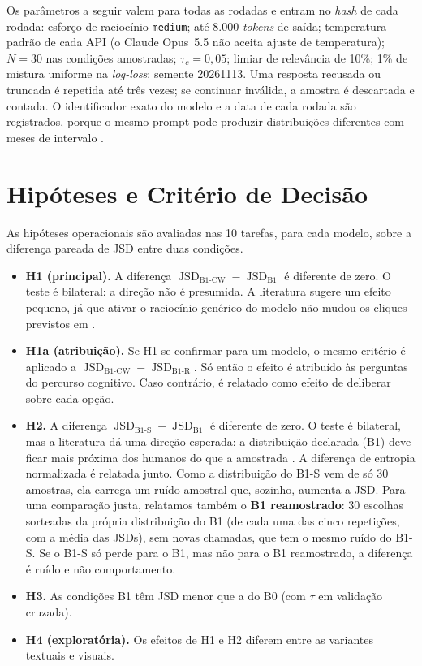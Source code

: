 \documentclass[12pt,oneside,a4paper,chapter=TITLE,english,brazil]{abntex2}
\newcommand{\code}[1]{\texttt{#1}}
\DeclareMathOperator{\JSD}{JSD}
\begin{document}
Os parâmetros a seguir valem para todas as rodadas e entram no \textit{hash} de cada rodada: esforço de raciocínio \code{medium}; até 8.000 \textit{tokens} de saída; temperatura padrão de cada API (o Claude Opus~5.5 não aceita ajuste de temperatura); $N=30$ nas condições amostradas; $\tau_c=0{,}05$; limiar de relevância de 10\%; 1\% de mistura uniforme na \textit{log-loss}; semente 20261113. Uma resposta recusada ou truncada é repetida até três vezes; se continuar inválida, a amostra é descartada e contada. O identificador exato do modelo e a data de cada rodada são registrados, porque o mesmo prompt pode produzir distribuições diferentes com meses de intervalo \cite{bisbee2024synthetic}.

\section{Hipóteses e Critério de Decisão}
\label{sec:hipoteses}

As hipóteses operacionais são avaliadas nas 10 tarefas, para cada modelo, sobre a diferença pareada de JSD entre duas condições.

\begin{itemize}
\item \textbf{H1 (principal).} A diferença $\JSD_{\text{B1-CW}}-\JSD_{\text{B1}}$ é diferente de zero. O teste é bilateral: a direção não é presumida. A literatura sugere um efeito pequeno, já que ativar o raciocínio genérico do modelo não mudou os cliques previstos em .
\item \textbf{H1a (atribuição).} Se H1 se confirmar para um modelo, o mesmo critério é aplicado a $\JSD_{\text{B1-CW}}-\JSD_{\text{B1-R}}$. Só então o efeito é atribuído às perguntas do percurso cognitivo. Caso contrário, é relatado como efeito de deliberar sobre cada opção.
\item \textbf{H2.} A diferença $\JSD_{\text{B1-S}}-\JSD_{\text{B1}}$ é diferente de zero. O teste é bilateral, mas a literatura dá uma direção esperada: a distribuição declarada (B1) deve ficar mais próxima dos humanos do que a amostrada \cite{meister2025distributional,jang2026cannotsample}. A diferença de entropia normalizada é relatada junto. Como a distribuição do B1-S vem de só 30 amostras, ela carrega um ruído amostral que, sozinho, aumenta a JSD. Para uma comparação justa, relatamos também o \textbf{B1 reamostrado}: 30 escolhas sorteadas da própria distribuição do B1 (de cada uma das cinco repetições, com a média das JSDs), sem novas chamadas, que tem o mesmo ruído do B1-S. Se o B1-S só perde para o B1, mas não para o B1 reamostrado, a diferença é ruído e não comportamento.
\item \textbf{H3.} As condições B1 têm JSD menor que a do B0 (com $\tau$ em validação cruzada).
\item \textbf{H4 (exploratória).} Os efeitos de H1 e H2 diferem entre as variantes textuais e visuais.
\end{itemize}
\end{document}
